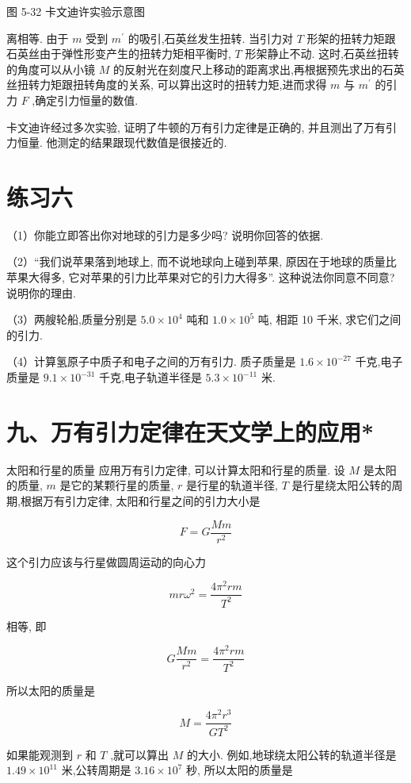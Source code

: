\documentclass[10pt]{article}
\begin{document}
图 5-32 卡文迪许实验示意图

离相等. 由于 \(m\) 受到 \({m}^{\prime }\) 的吸引,石英丝发生扭转. 当引力对 \(T\) 形架的扭转力矩跟石英丝由于弹性形变产生的扭转力矩相平衡时, \(T\) 形架静止不动. 这时,石英丝扭转的角度可以从小镜 \(M\) 的反射光在刻度尺上移动的距离求出,再根据预先求出的石英丝扭转力矩跟扭转角度的关系, 可以算出这时的扭转力矩,进而求得 \(m\) 与 \({m}^{\prime }\) 的引力 \(F\) ,确定引力恒量的数值.

卡文迪许经过多次实验, 证明了牛顿的万有引力定律是正确的, 并且测出了万有引力恒量. 他测定的结果跟现代数值是很接近的.

\section*{练习六}

（1）你能立即答出你对地球的引力是多少吗? 说明你回答的依据.

（2）“我们说苹果落到地球上, 而不说地球向上碰到苹果, 原因在于地球的质量比苹果大得多, 它对苹果的引力比苹果对它的引力大得多”. 这种说法你同意不同意? 说明你的理由.

（3）两艘轮船,质量分别是 \({5.0} \times {10}^{4}\) 吨和 \({1.0} \times {10}^{5}\) 吨, 相距 10 千米, 求它们之间的引力.

（4）计算氢原子中质子和电子之间的万有引力. 质子质量是 \({1.6} \times {10}^{-{27}}\) 千克,电子质量是 \({9.1} \times {10}^{-{31}}\) 千克,电子轨道半径是 \({5.3} \times {10}^{-{11}}\) 米.

\section*{九、万有引力定律在天文学上的应用*}

太阳和行星的质量 应用万有引力定律, 可以计算太阳和行星的质量. 设 \(M\) 是太阳的质量, \(m\) 是它的某颗行星的质量, \(r\) 是行星的轨道半径, \(T\) 是行星绕太阳公转的周期,根据万有引力定律, 太阳和行星之间的引力大小是

\[
F = G\frac{Mm}{{r}^{2}}
\]

这个引力应该与行星做圆周运动的向心力

\[
{mr}{\omega }^{2} = \frac{4{\pi }^{2}{rm}}{{T}^{2}}
\]

相等, 即

\[
G\frac{Mm}{{r}^{2}} = \frac{4{\pi }^{2}{rm}}{{T}^{2}}
\]

所以太阳的质量是

\[
M = \frac{4{\pi }^{2}{r}^{3}}{G{T}^{2}}
\]

如果能观测到 \(r\) 和 \(T\) ,就可以算出 \(M\) 的大小. 例如,地球绕太阳公转的轨道半径是 \({1.49} \times {10}^{11}\) 米,公转周期是 \({3.16} \times {10}^{7}\) 秒, 所以太阳的质量是
\end{document}
